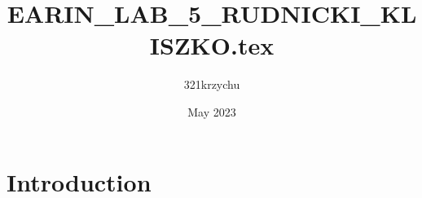\documentclass{article}
\title{EARIN_LAB_5_RUDNICKI_KLISZKO.tex}
\author{321krzychu }
\date{May 2023}
\begin{document}
\maketitle

\section{Introduction}
\end{document}
